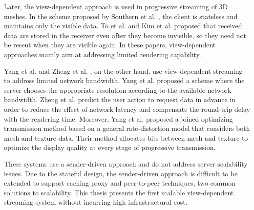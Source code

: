     Later, the view-dependent approach is used in progressive 
	streaming of 3D meshes.     
    In the scheme proposed by Southern et al. \cite{363375},  the client is stateless and
    maintains only the visible data. 
    To et al. \cite{To1999}
    and Kim et al. \cite{kim:view} proposed that received data are stored
    in the receiver even after they become invisible, 
    so they need not be resent when they are visible again. 
    In these papers, view-dependent approaches mainly aim at addressing
    limited rendering capability. 
    
    Yang et al. \cite{progressive:Yang} and
    Zheng et al. \cite{zheng:interactive}, on the other hand, use
    view-dependent streaming to address limited network bandwidth.
    Yang et al. proposed a scheme where the server chooses the appropriate resolution
    according to the available network bandwidth.
    Zheng et al. \cite{zheng:interactive} predict the user action to
    request data in advance in order to
    reduce the effect of network latency and 
    compensate the round-trip delay with the rendering time.
    Moreover, Yang et al. \cite{optimized:yang} proposed a joined 
    optimizing transmission method based on a general rate-distortion
    model that considers both mesh and texture data. Their method
    allocates bits between mesh and texture to optimize the display 
    quality at every stage of progressive transmission.
     
    These systems use a sender-driven approach and do not address
    server scalability issues. Due to the stateful design, 
    the sender-driven approach is difficult to be extended to
    support caching proxy and peer-to-peer techniques, two 
    common solutions to scalability. This thesis presents the first
    scalable 
    view-dependent streaming system without incurring high infrastructural cost.
    

